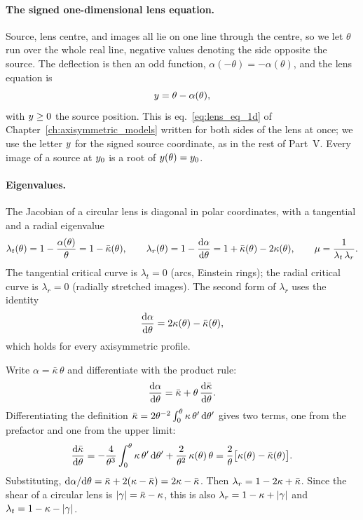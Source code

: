 \paragraph{The signed one-dimensional lens equation.}
Source, lens centre, and images all lie on one line through the centre,
so we let $\theta$ run over the whole real line, negative values
denoting the side opposite the source.  The deflection is then an odd
function, $\alpha(-\theta)=-\alpha(\theta)$, and the lens equation is
\begin{equation}
    y = \theta - \alpha(\theta) ,
    \label{eq:pl_lens_eq_signed}
\end{equation}
with $y\ge0$ the source position.  This is
eq.~\eqref{eq:lens_eq_1d} of Chapter~\ref{ch:axisymmetric_models}
written for both sides of the lens at once; we use the letter $y$
for the signed source coordinate, as in the rest of Part~V.  Every image
of a source at $y_0$ is a root of $y(\theta)=y_0$.

\paragraph{Eigenvalues.}
The Jacobian of a circular lens is diagonal in polar coordinates, with
a tangential and a radial eigenvalue
\begin{equation}
    \lambda_t(\theta) = 1-\frac{\alpha(\theta)}{\theta} = 1-\bar\kappa(\theta) ,
    \qquad
    \lambda_r(\theta) = 1-\frac{\mathrm{d} \alpha}{\mathrm{d} \theta} = 1+\bar\kappa(\theta)-2\kappa(\theta) ,
    \qquad
    \mu = \frac{1}{\lambda_t\,\lambda_r} .
    \label{eq:pl_eigenvalues}
\end{equation}
The tangential critical curve is $\lambda_t=0$ (arcs, Einstein rings);
the radial critical curve is $\lambda_r=0$ (radially stretched images).
The second form of $\lambda_r$ uses the identity
\begin{equation}
    \frac{\mathrm{d} \alpha}{\mathrm{d} \theta} = 2\kappa(\theta)-\bar\kappa(\theta) ,
    \label{eq:pl_dalpha}
\end{equation}
which holds for every axisymmetric profile.

\begin{derivation}[The identity $\dd\alpha/\dd\theta = 2\kappa-\bar\kappa$]
Write $\alpha=\bar\kappa\,\theta$ and differentiate with the product rule:
\[
  \frac{\mathrm{d} \alpha}{\mathrm{d} \theta} = \bar\kappa + \theta\,\frac{\mathrm{d} \bar\kappa}{\mathrm{d} \theta} .
\]
Differentiating the definition
$\bar\kappa=2\theta^{-2}\int_0^\theta\kappa\,\theta'\,\dd\theta'$
gives two terms, one from the prefactor and one from the upper limit:
\[
  \frac{\mathrm{d} \bar\kappa}{\mathrm{d} \theta}
  = -\frac{4}{\theta^3}\int_0^\theta\kappa\,\theta'\,\dd\theta' + \frac{2}{\theta^2}\,\kappa(\theta)\,\theta
  = \frac{2}{\theta}\big[\kappa(\theta)-\bar\kappa(\theta)\big] .
\]
Substituting, $\dd\alpha/\dd\theta = \bar\kappa + 2(\kappa-\bar\kappa) = 2\kappa-\bar\kappa$.
Then $\lambda_r = 1-2\kappa+\bar\kappa$.  Since the shear of a circular
lens is $|\gamma|=\bar\kappa-\kappa$, this is also
$\lambda_r=1-\kappa+|\gamma|$ and $\lambda_t=1-\kappa-|\gamma|$.
\end{derivation}

